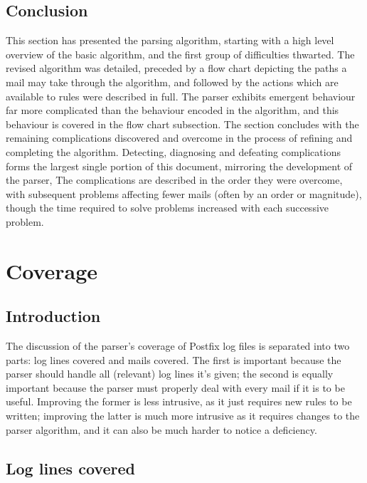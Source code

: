 \documentclass[a4paper,12pt,draft]{article}
\begin{document}
\subsection{Conclusion}

This section has presented the parsing algorithm, starting with a high
level overview of the basic algorithm, and the first group of difficulties
thwarted.  The revised algorithm was detailed, preceded by a flow chart
depicting the paths a mail may take through the algorithm, and followed by
the actions which are available to rules were described in full.  The
parser exhibits emergent behaviour far more complicated than the behaviour
encoded in the algorithm, and this behaviour is covered in the flow chart
subsection.  The section concludes with the remaining complications
discovered and overcome in the process of refining and completing the
algorithm.  Detecting, diagnosing and defeating complications forms the
largest single portion of this document, mirroring the development of the
parser,  The complications are described in the order they were overcome,
with subsequent problems affecting fewer mails (often by an order or
magnitude), though the time required to solve problems increased with each
successive problem.

\section{Coverage}

\label{parsing coverage}

\subsection{Introduction}

The discussion of the parser's coverage of Postfix log files is separated
into two parts: log lines covered and mails covered.  The first is
important because the parser should handle all (relevant) log lines it's
given; the second is equally important because the parser must properly
deal with every mail if it is to be useful.  Improving the former is
less intrusive, as it just requires new rules to be written; improving the
latter is much more intrusive as it requires changes to the parser
algorithm, and it can also be much harder to notice a deficiency.

\subsection{Log lines covered}
\end{document}
